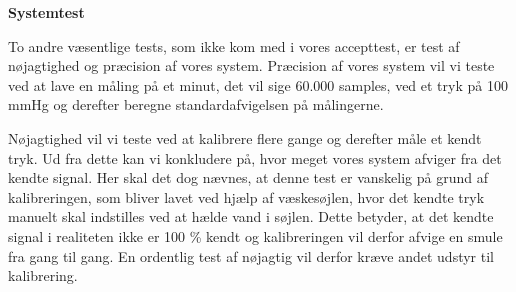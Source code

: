 \textbf{Systemtest}

To andre væsentlige tests, som ikke kom med i vores accepttest, er test af nøjagtighed og præcision af vores system. Præcision af vores system vil vi teste ved at lave en måling på et minut, det vil sige 60.000 samples, ved et tryk på 100 mmHg og derefter beregne standardafvigelsen på målingerne. 

Nøjagtighed vil vi teste ved at kalibrere flere gange og derefter måle et kendt tryk. Ud fra dette kan vi konkludere på, hvor meget vores system afviger fra det kendte signal. Her skal det dog nævnes, at denne test er vanskelig på grund af kalibreringen, som bliver lavet ved hjælp af væskesøjlen, hvor det kendte tryk manuelt skal indstilles ved at hælde vand i søjlen. Dette betyder, at det kendte signal i realiteten ikke er 100 \% kendt og kalibreringen vil derfor afvige en smule fra gang til gang. En ordentlig test af nøjagtig vil derfor kræve andet udstyr til kalibrering. 

